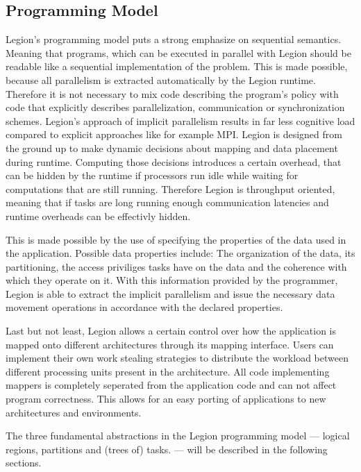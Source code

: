 \documentclass{article}      %
\begin{document}
\subsection{Programming Model}\label{sec:programmingModel}
Legion's programming model puts a strong emphasize on sequential semantics. Meaning that programs, which can be executed in parallel with Legion should be readable like a sequential implementation of the problem. This is made possible, because all parallelism is extracted automatically by the Legion runtime. Therefore it is not necessary to mix code describing the program's policy with code that explicitly describes parallelization, communication or synchronization schemes. Legion's approach of implicit parallelism results in far less cognitive load compared to explicit approaches like for example MPI. Legion is designed from the ground up to make dynamic decisions about mapping and data placement during runtime. Computing those decisions introduces a certain overhead, that can be hidden by the runtime if processors run idle while waiting for computations that are still running. Therefore Legion is throughput oriented, meaning that if tasks are long running enough communication latencies and runtime overheads can be effectivly hidden.

This is made possible by the use of specifying the properties of the data used in the application. Possible data properties include: The organization of the data, its partitioning, the access priviliges tasks have on the data and the coherence with which they operate on it. With this information provided by the programmer, Legion is able to extract the implicit parallelism and issue the necessary data movement operations in accordance with the declared properties.

Last but not least, Legion allows a certain control over how the application is mapped onto different architectures through its mapping interface. Users can implement their own work stealing strategies to distribute the workload between different processing units present in the architecture. All code implementing mappers is completely seperated from the application code and can not affect program correctness. This allows for an easy porting of applications to new architectures and environments.

The three fundamental abstractions in the Legion programming model --- logical regions, partitions and (trees of) tasks. --- will be described in the following sections.
\end{document}
